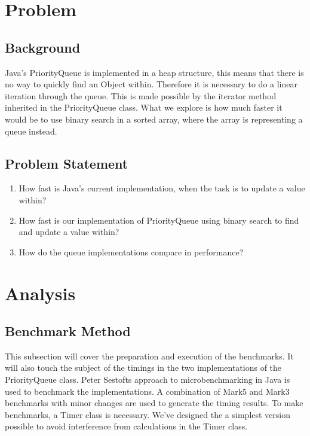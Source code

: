 \documentclass{article}
\begin{document}
\section{Problem}
\subsection{Background}
Java's PriorityQueue is implemented in a heap structure, this means that there is no way to quickly find an Object within.
Therefore it is necessary to do a linear iteration through the queue. This is made possible by 
the iterator method inherited in the PriorityQueue class. What we explore is how much faster it would 
be to use binary search in a sorted array, where the array is representing a queue instead.  
\subsection{Problem Statement}
\begin{enumerate}
    \item How fast is Java's current implementation, when the task is to update a value within?
    \item How fast is our implementation of PriorityQueue using binary search to find and update a value within?
    \item How do the queue implementations compare in performance?
\end{enumerate}


\section{Analysis}
\subsection{Benchmark Method} %
This subsection will cover the preparation and execution of the benchmarks.
It will also touch the subject of the timings in the two implementations
of the PriorityQueue class. Peter Sestofts approach to microbenchmarking in 
Java \cite{microbenchmarks} is used to benchmark the implementations. A combination of Mark5 and Mark3 
benchmarks with minor changes are used to generate the timing results. 
To make benchmarks, a Timer class is necessary. We've designed the a simplest
version possible to avoid interference from calculations in the Timer class.
\end{document}
